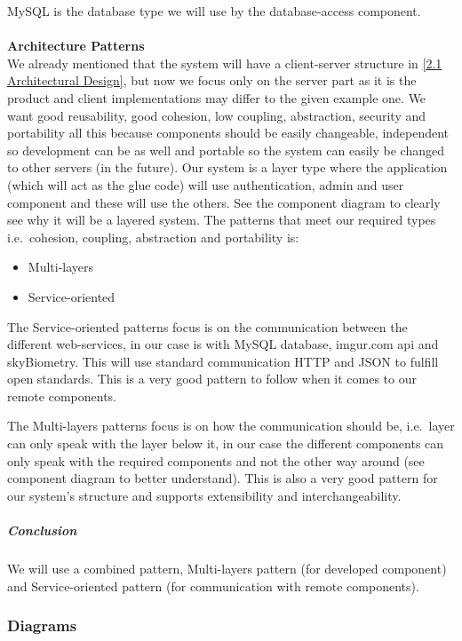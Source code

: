 \documentclass[a4paper,11pt]{article}
\begin{document}
MySQL is the database type we will use by the database-access component.
\\ \\
\textbf{Architecture Patterns}\label{architecture-pattern} \\
We already mentioned that the system will have a client-server structure in \ref{2.1 Architectural Design}, but now we focus only on the server part as it is the product and client implementations may differ to the given example one.
We want good reusability, good cohesion, low coupling, abstraction, security and
portability all this because components should be easily changeable,
independent so development can be as well and portable so the system can
easily be changed to other servers (in the future). Our system is a
layer type where the application (which will act as the glue code) will
use authentication, admin and user component and these will use the
others. See the component diagram to clearly see why it will be a
layered system. The patterns that meet our required types
i.e.~cohesion, coupling, abstraction and portability is:

\begin{itemize}
\item
  Multi-layers
\item
  Service-oriented
\end{itemize}


The Service-oriented patterns focus is on the communication between the
different web-services, in our case is with MySQL database, imgur.com
api and skyBiometry. This will use standard communication HTTP and JSON to fulfill open standards. This is a very good pattern to follow when it comes to our
remote components. 
 
The Multi-layers patterns focus is on how the communication should be,
i.e.~layer can only speak with the layer below it, in our case the
different components can only speak with the required components and not
the other way around (see component diagram to better understand). This
is also a very good pattern for our system's structure and supports extensibility and interchangeability.

\subparagraph{Conclusion}\label{conclusion}

We will use a combined pattern, Multi-layers pattern (for developed
component) and Service-oriented pattern (for communication with remote
components).

\newpage

\subsubsection{Diagrams}\label{diagrams}
\end{document}
